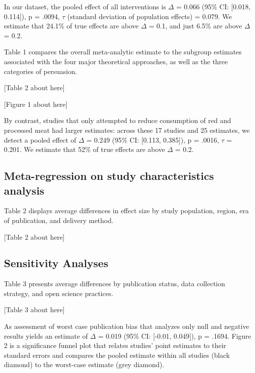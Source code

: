 \documentclass[sn-nature,referee,pdflatex]{sn-jnl}
\begin{document}
In our dataset, the pooled effect of all interventions is \(\Delta\) =
0.066 (95\% CI: {[}0.018, 0.114{]}), p = .0094, \(\tau\) (standard
deviation of population effects) = 0.079. We estimate that 24.1\% of
true effects are above \(\Delta\) = 0.1, and just 6.5\% are above
\(\Delta\) = 0.2.

Table 1 compares the overall meta-analytic estimate to the subgroup
estimates associated with the four major theoretical approaches, as well
as the three categories of persuasion.

\begin{center}
[Table 2 about here]
\end{center}

\begin{center}
[Figure 1 about here]
\end{center}

By contrast, studies that only attempted to reduce consumption of red
and processed meat had larger estimates: across these 17 studies and 25
estimates, we detect a pooled effect of \(\Delta\) = 0.249 (95\% CI:
{[}0.113, 0.385{]}), p = .0016, \(\tau\) = 0.201. We estimate that 52\%
of true effects are above \(\Delta\) = 0.2.

\subsection{Meta-regression on study characteristics
analysis}\label{sec2.4}

Table 2 displays average differences in effect size by study population,
region, era of publication, and delivery method.

\begin{center}
[Table 2 about here]
\end{center}

\subsection{Sensitivity Analyses}\label{sec2.5}

Table 3 presents average differences by publication status, data
collection strategy, and open science practices.

\begin{center}
[Table 3 about here]
\end{center}

As assessment of worst case publication bias that analyzes only null and
negative results \citep{mathur2024} yields an estimate of \(\Delta\) =
0.019 (95\% CI: {[}-0.01, 0.049{]}), p = .1694. Figure 2 is a
significance funnel plot \citep{mathur2020} that relates studies' point
estimates to their standard errors and compares the pooled estimate
within all studies (black diamond) to the worst-case estimate (grey
diamond).
\end{document}
